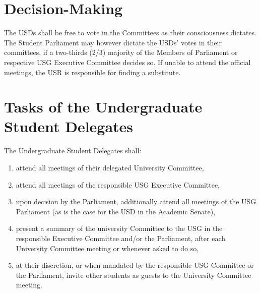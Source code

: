 \section{Decision-Making}
The USDs shall be free to vote in the  Committees as their consciousness dictates. The Student Parliament may however dictate the USDs' votes in their  committees, if a two-thirds (2/3) majority of the Members of Parliament or respective USG Executive Committee decides so. If unable to attend the official meetings, the USR is responsible for finding a substitute.

\section{Tasks of the Undergraduate Student Delegates}
The Undergraduate Student Delegates shall:
\begin{enumerate}
    \item attend all meetings of their delegated University Committee,
    \item attend all meetings of the responsible USG Executive Committee,
    \item upon decision by the Parliament, additionally attend all meetings of the USG Parliament (as is the case for the USD in the Academic Senate),
    \item present a summary of the university Committee to the USG in the responsible Executive Committee and/or the Parliament, after each University Committee meeting or whenever asked to do so,
    \item at their discretion, or when mandated by the responsible USG Committee or the Parliament, invite other students as guests to the University Committee meeting.
\end{enumerate}